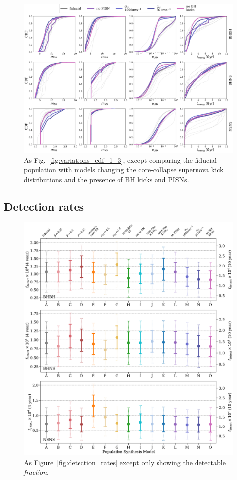 \documentclass[twocolumn]{aastex63}
\begin{document}
\begin{figure}[h]
    \centering
    \includegraphics[width=\textwidth]{variations_cdf_11_14.pdf}
    \caption{As Fig.~\ref{fig:variations_cdf_1_3}, except comparing the fiducial population with models changing the core-collapse supernova kick distributions and the presence of BH kicks and PISNs.}
    \label{fig:variations_cdf_11_14}
\end{figure}

\subsection{Detection rates}

\begin{figure}[p]
    \centering
    \includegraphics[width=\textwidth]{dco_detections_fractions.pdf}
    \caption{As Figure~\ref{fig:detection_rates} except only showing the detectable \textit{fraction}.}
    \label{fig:detection_fractions}
\end{figure}
\end{document}
